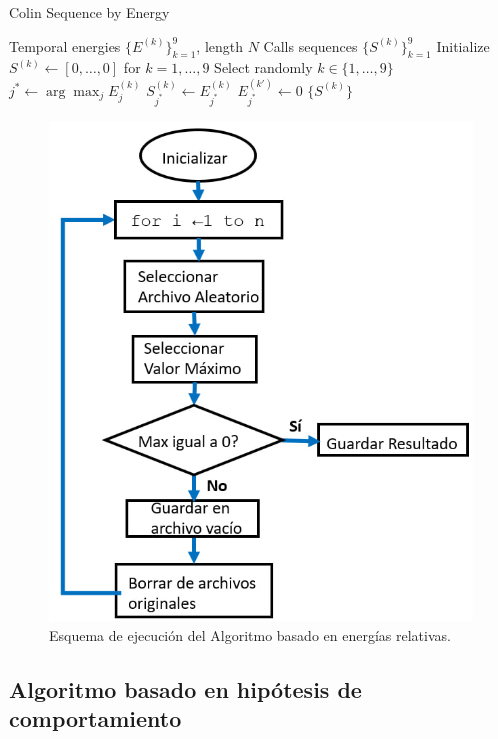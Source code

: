 \begin{algorithm}
    \caption{Colin Sequence by Energy}
    \begin{algorithmic}[1]
    \Require 
      Temporal energies \(\{E^{(k)}\}_{k=1}^9\), length \(N\)
    \Ensure
      Calls sequences \(\{S^{(k)}\}_{k=1}^9\)
    \State Initialize \(S^{(k)} \leftarrow [0,\dots,0]\) for \(k=1,\dots,9\)
      \State Select randomly \(k\in\{1,\dots,9\}\)
      \State \(j^* \leftarrow \arg\max_j E^{(k)}_j\)
      \State \(S^{(k)}_{j^*} \leftarrow E^{(k)}_{j^*}\)
        \State \(E^{(k')}_{j^*} \leftarrow 0\)
      \EndFor
    \EndWhile
    \State \Return \(\{S^{(k)}\}\)
    \end{algorithmic}
\end{algorithm}

\begin{figure}[ht]
    \centering
    \includegraphics[width=0.7\linewidth]{Graphics/algorithm.jpg}
    \caption{Esquema de ejecución del Algoritmo basado en energías relativas.}
    \label{fig:algorithm}
\end{figure}


\subsection{Algoritmo basado en hipótesis de comportamiento}

